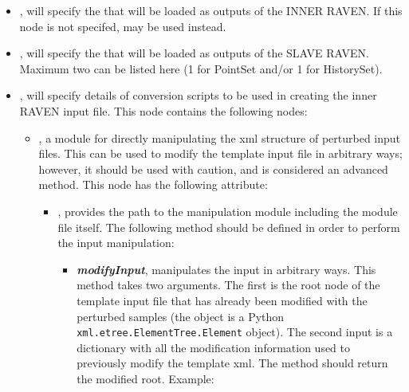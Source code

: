 \begin{itemize} %
  \item  {}, 
    will specify the  that will be loaded as outputs of the INNER RAVEN. If this node
    is not specifed,  may be used instead.
  \item  {},  will specify the   that will be loaded as outputs of the SLAVE RAVEN.
    Maximum two   can be listed here (1 for PointSet and/or 1 for HistorySet).
  \item  {},  will specify details of conversion scripts to
    be used in creating the inner RAVEN input file.  This node contains the following nodes:
    \begin{itemize} %
      \item {},  a module for directly manipulating the xml
        structure of perturbed input files. This can be used to modify the template input file in arbitrary
        ways; however, it should be used with caution, and is considered an advanced method.
        This node has the following attribute:
        \begin{itemize} %
          \item {},  provides the path to the manipulation module including
              the module file itself.  The following method should be defined in order to perform the input
              manipulation:
              \begin{itemize} %
                 \item \textbf{\textit{modifyInput}}, manipulates the input in arbitrary ways. This method
                   takes two arguments. The first is the root  node of the template input
                   file that has already been modified with the perturbed samples (the object is a Python
                   \texttt{xml.etree.ElementTree.Element} object). The second input is a dictionary with all
                   the modification information used to previously modify the template xml. The method should
                   return the modified root.
                 Example:
                  \begin{lstlisting}[language=python]

\end{lstlisting}
\end{itemize}
\end{itemize}
\end{itemize}
\end{itemize}
